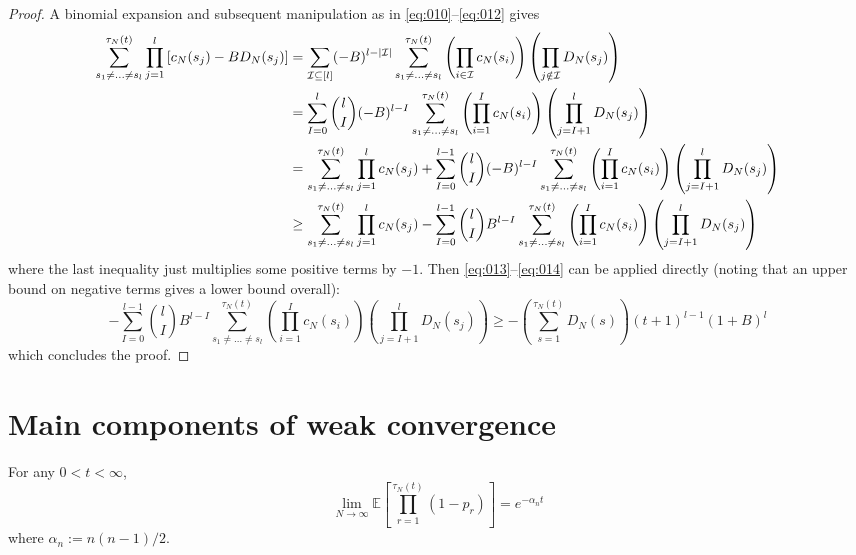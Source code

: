 \documentclass{article}
\newcommand{\E}{\mathbb{E}}
\newcommand{\1}[1]{\mathbbm{1}_{#1}}
\begin{document}
\begin{proof}
A binomial expansion and subsequent manipulation as in \eqref{eq:010}--\eqref{eq:012} gives
\begin{align}
\sum_{s_1\neq\dots\neq s_l}^{\tau_N(t)} \prod_{j=1}^l 
        \left[ c_N(s_j) - B D_N(s_j) \right]
&= \sum_{\mathcal{I} \subseteq [l]} (-B)^{l-|\mathcal{I}|}
        \sum_{s_1\neq\dots\neq s_l}^{\tau_N(t)}
        \left( \prod_{i\in\mathcal{I}} c_N(s_i) \right)
        \left( \prod_{j\notin\mathcal{I}} D_N(s_j) \right) \notag\\
&= \sum_{I=0}^l \binom{l}{I} (-B)^{l-I} 
        \sum_{s_1\neq\dots\neq s_l}^{\tau_N(t)}
        \left( \prod_{i=1}^I c_N(s_i) \right)
        \left( \prod_{j=I+1}^l D_N(s_j) \right) \notag\\
&= \sum_{s_1\neq\dots\neq s_l}^{\tau_N(t)} \prod_{j=1}^l c_N(s_j)
        + \sum_{I=0}^{l-1} \binom{l}{I} (-B)^{l-I} 
        \sum_{s_1\neq\dots\neq s_l}^{\tau_N(t)}
        \left( \prod_{i=1}^I c_N(s_i) \right) 
        \left( \prod_{j=I+1}^l D_N(s_j) \right) \notag\\
&\geq \sum_{s_1\neq\dots\neq s_l}^{\tau_N(t)} \prod_{j=1}^l c_N(s_j)
        - \sum_{I=0}^{l-1} \binom{l}{I} B^{l-I} 
        \sum_{s_1\neq\dots\neq s_l}^{\tau_N(t)}
        \left( \prod_{i=1}^I c_N(s_i) \right) \left( \prod_{j=I+1}^l D_N(s_j) \right)
\end{align}
where the last inequality just multiplies some positive terms by $-1$.
Then \eqref{eq:013}--\eqref{eq:014} can be applied directly (noting that an upper bound on negative terms gives a lower bound overall):
\begin{equation}
- \sum_{I=0}^{l-1} \binom{l}{I} B^{l-I} 
        \sum_{s_1\neq\dots\neq s_l}^{\tau_N(t)}
        \left( \prod_{i=1}^I c_N(s_i) \right) \left( \prod_{j=I+1}^l D_N(s_j) \right)
\geq - \left( \sum_{s=1}^{\tau_N(t)} D_N(s) \right) (t+1)^{l-1} (1+B)^l 
\end{equation}
which concludes the proof.
\end{proof}


\section*{Main components of weak convergence}

\begin{lemma}\label{thm:basis}
For any $0 < t < \infty$,
\begin{equation}
\lim_{N\to\infty} \E\left[ \prod_{r=1}^{\tau_N(t)} (1-p_r) \right] 
= e^{-\alpha_n t}
\end{equation}
where $\alpha_n := n(n-1)/2$.
\end{lemma}
\end{document}
